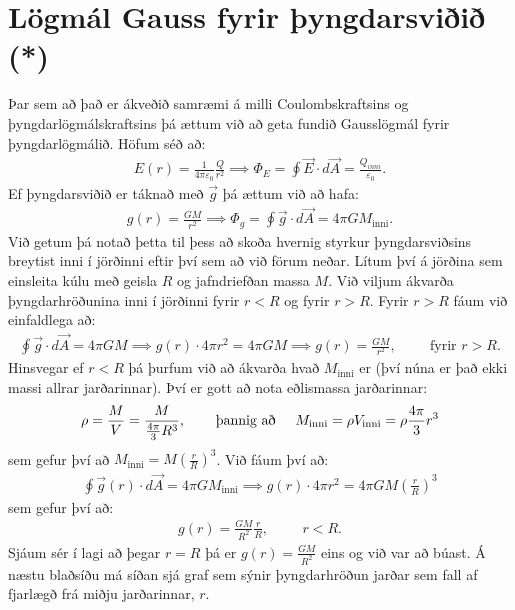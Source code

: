 \ifdefined \wholebook \else\documentclass[oneside]{book}\usepackage{EdlBook}\graphicspath{{figures/}}
\begin{document}
\section{Lögmál Gauss fyrir þyngdarsviðið (*)}

Þar sem að það er ákveðið samræmi á milli Coulombskraftsins og þyngdarlögmálskraftsins þá ættum við að geta fundið Gausslögmál fyrir þyngdarlögmálið. Höfum séð að:
\begin{align*}
    E(r) = \frac{1}{4\pi \varepsilon_0} \frac{Q}{r^2} \implies \Phi_E = \oint  \vec{E} \cdot d\vec{A} = \frac{Q_{inni}}{\varepsilon_0}.
\end{align*}
Ef þyngdarsviðið er táknað með $\vec{g}$ þá ættum við að hafa:
\begin{align*}
    g(r) = \frac{GM}{r^2} \implies \Phi_g = \oint \vec{g} \cdot d\vec{A} = 4\pi G M_{\text{inni}}.
\end{align*}
Við getum þá notað þetta til þess að skoða hvernig styrkur þyngdarsviðsins breytist inni í jörðinni eftir því sem að við förum neðar. Lítum því á jörðina sem einsleita kúlu með geisla $R$ og jafndriefðan massa $M$. Við viljum ákvarða þyngdarhröðunina inni í jörðinni fyrir $r < R$ og fyrir $r > R$. Fyrir $r > R$ fáum við einfaldlega að:
\begin{align*}
    \oint \vec{g} \cdot d\vec{A} = 4\pi GM \implies g(r) \cdot 4 \pi r^2 = 4\pi G M \implies g(r) = \frac{GM}{r^2}, \hspace{1cm} \text{fyrir $r > R$.}
\end{align*}
Hinsvegar ef $r < R$ þá þurfum við að ákvarða hvað $M_{\text{inni}}$ er (því núna er það ekki massi allrar jarðarinnar). Því er gott að nota eðlismassa jarðarinnar:
\begin{align*}
    \rho = \frac{M}{V} = \frac{M}{\frac{4\pi}{3} R^3}, \hspace{0.75cm} \text{þannig að} \hspace{0.5cm} M_{\text{inni}} = \rho V_{\text{inni}} = \rho \frac{4\pi}{3}r^3
\end{align*}
sem gefur því að $M_{\text{inni}} = M\left( \frac{r}{R} \right)^3$. Við fáum því að:
\begin{align*}
    \oint \vec{g}(r) \cdot d \vec{A} = 4\pi G M_{\text{inni}} \implies g(r) \cdot 4\pi r^2 = 4\pi G M \left( \frac{r}{R} \right)^3
\end{align*}
sem gefur því að:
\begin{align*}
    g(r) = \frac{GM}{R^2} \frac{r}{R}, \hspace{1cm} r < R.
\end{align*}
Sjáum sér í lagi að þegar $r = R$ þá er $g(r) = \frac{GM}{R^2}$ eins og við var að búast. Á næstu blaðsíðu má síðan sjá graf sem sýnir þyngdarhröðun jarðar sem fall af fjarlægð frá miðju jarðarinnar, $r$.
\end{document}

